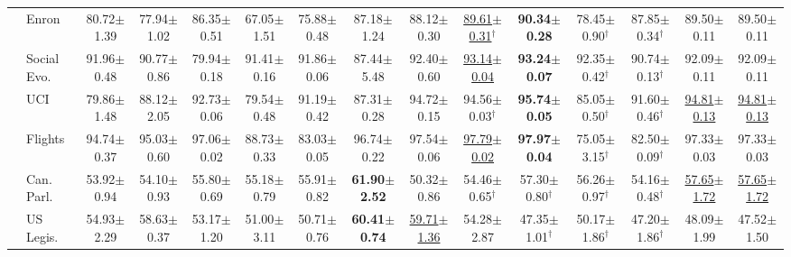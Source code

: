 \begin{table}[t]
{\begin{tabular}{llccccccccccccc}
 & Enron & 80.72{\scriptsize$\pm$1.39} & 77.94{\scriptsize$\pm$1.02} & 86.35{\scriptsize$\pm$0.51} & 67.05{\scriptsize$\pm$1.51} & 75.88{\scriptsize$\pm$0.48} & 87.18{\scriptsize$\pm$1.24} & 88.12{\scriptsize$\pm$0.30} & \underline{89.61{\scriptsize$\pm$0.31}}$^\dagger$ & \textbf{90.34{\scriptsize$\pm$0.28}} & 78.45{\scriptsize$\pm$0.90}$^\dagger$ & 87.85{\scriptsize$\pm$0.34}$^\dagger$ & 89.50{\scriptsize$\pm$0.11} & 89.50{\scriptsize$\pm$0.11} \\
 & Social Evo. & 91.96{\scriptsize$\pm$0.48} & 90.77{\scriptsize$\pm$0.86} & 79.94{\scriptsize$\pm$0.18} & 91.41{\scriptsize$\pm$0.16} & 91.86{\scriptsize$\pm$0.06} & 87.44{\scriptsize$\pm$5.48} & 92.40{\scriptsize$\pm$0.60} & \underline{93.14{\scriptsize$\pm$0.04}} & \textbf{93.24{\scriptsize$\pm$0.07}} & 92.35{\scriptsize$\pm$0.42}$^\dagger$ & 90.74{\scriptsize$\pm$0.13}$^\dagger$ & 92.09{\scriptsize$\pm$0.11} & 92.09{\scriptsize$\pm$0.11} \\
 & UCI & 79.86{\scriptsize$\pm$1.48} & 88.12{\scriptsize$\pm$2.05} & 92.73{\scriptsize$\pm$0.06} & 79.54{\scriptsize$\pm$0.48} & 91.19{\scriptsize$\pm$0.42} & 87.31{\scriptsize$\pm$0.28} & 94.72{\scriptsize$\pm$0.15} & 94.56{\scriptsize$\pm$0.03}$^\dagger$ & \textbf{95.74{\scriptsize$\pm$0.05}} & 85.05{\scriptsize$\pm$0.50}$^\dagger$ & 91.60{\scriptsize$\pm$0.46}$^\dagger$ & \underline{94.81{\scriptsize$\pm$0.13}} & \underline{94.81{\scriptsize$\pm$0.13}} \\
 & Flights & 94.74{\scriptsize$\pm$0.37} & 95.03{\scriptsize$\pm$0.60} & 97.06{\scriptsize$\pm$0.02} & 88.73{\scriptsize$\pm$0.33} & 83.03{\scriptsize$\pm$0.05} & 96.74{\scriptsize$\pm$0.22} & 97.54{\scriptsize$\pm$0.06} & \underline{97.79{\scriptsize$\pm$0.02}} & \textbf{97.97{\scriptsize$\pm$0.04}} & 75.05{\scriptsize$\pm$3.15}$^\dagger$ & 82.50{\scriptsize$\pm$0.09}$^\dagger$ & 97.33{\scriptsize$\pm$0.03} & 97.33{\scriptsize$\pm$0.03} \\
 & Can. Parl. & 53.92{\scriptsize$\pm$0.94} & 54.10{\scriptsize$\pm$0.93} & 55.80{\scriptsize$\pm$0.69} & 55.18{\scriptsize$\pm$0.79} & 55.91{\scriptsize$\pm$0.82} & \textbf{61.90{\scriptsize$\pm$2.52}} & 50.32{\scriptsize$\pm$0.86} & 54.46{\scriptsize$\pm$0.65}$^\dagger$ & 57.30{\scriptsize$\pm$0.80}$^\dagger$ & 56.26{\scriptsize$\pm$0.97}$^\dagger$ & 54.16{\scriptsize$\pm$0.48}$^\dagger$ & \underline{57.65{\scriptsize$\pm$1.72}} & \underline{57.65{\scriptsize$\pm$1.72}} \\
 & US Legis. & 54.93{\scriptsize$\pm$2.29} & 58.63{\scriptsize$\pm$0.37} & 53.17{\scriptsize$\pm$1.20} & 51.00{\scriptsize$\pm$3.11} & 50.71{\scriptsize$\pm$0.76} & \textbf{60.41{\scriptsize$\pm$0.74}} & \underline{59.71{\scriptsize$\pm$1.36}} & 54.28{\scriptsize$\pm$2.87} & 47.35{\scriptsize$\pm$1.01}$^\dagger$ & 50.17{\scriptsize$\pm$1.86}$^\dagger$ & 47.20{\scriptsize$\pm$1.86}$^\dagger$ & 48.09{\scriptsize$\pm$1.99} & 47.52{\scriptsize$\pm$1.50} \\

\end{tabular}}
\end{table}
